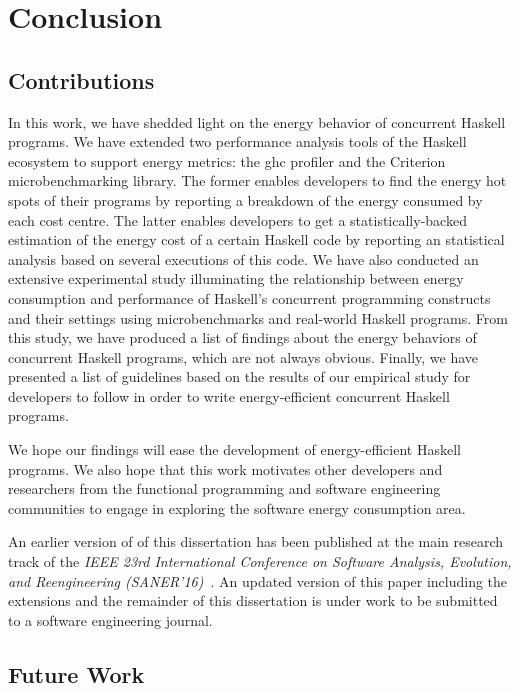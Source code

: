 \chapter{Conclusion}\label{chp:conclusion}

\section{Contributions}
In this work, we have shedded light on the energy behavior of concurrent Haskell programs. We have extended two performance analysis tools of the Haskell ecosystem to support energy metrics: the \ac{ghc} profiler and the Criterion microbenchmarking library. The former enables developers to find the energy hot spots of their programs by reporting a breakdown of the energy consumed by each cost centre. The latter enables developers to get a statistically-backed estimation of the energy cost of a certain Haskell code by reporting an statistical analysis based on several executions of this code. We have also conducted an extensive experimental study illuminating the relationship between energy consumption and performance of Haskell's concurrent programming constructs and their settings using microbenchmarks and real-world Haskell programs. From this study, we have produced a list of findings about the energy behaviors of concurrent Haskell programs, which are not always obvious. Finally, we have presented a list of guidelines based on the results of our empirical study for developers to follow in order to write energy-efficient concurrent Haskell programs.

We hope our findings will ease the development of energy-efficient Haskell programs. We also hope that this work motivates other developers and researchers from the functional programming and software engineering communities to engage in exploring the software energy consumption area.

An earlier version of \textbf{} of this dissertation has been published at the main research track of the \emph{IEEE 23rd International Conference on Software Analysis, Evolution, and Reengineering (SANER'16)}~\cite{lima:2016}. An updated version of this paper including the extensions and the remainder of this dissertation is under work to be submitted to a software engineering journal.

\section{Future Work}
\lipsum[2-3]
